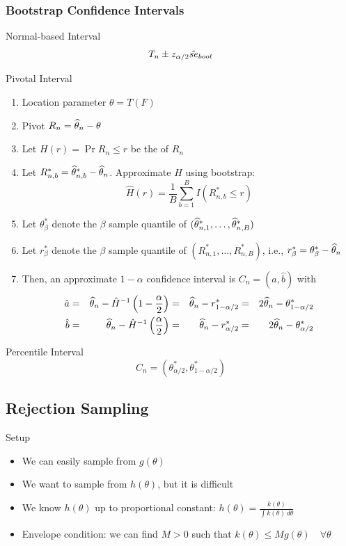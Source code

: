\documentclass[landscape]{article}
\begin{document}
\begin{multicols*}{2}
\subsubsection{Bootstrap Confidence Intervals}

Normal-based Interval
$$T_n \pm z_{\alpha/2}\hat{se}_{boot}$$

Pivotal Interval
\begin{enumerate}
  \item Location parameter $\theta = T(F)$
  \item Pivot $R_n = \widehat{\theta}_n - \theta$ 
  \item Let $H(r) = \Pr{R_n \le r}$ be the \cdf of $R_n$
  \item Let $R_{n,b}^* = \widehat{\theta}_{n,b}^* - \widehat{\theta}_n$.
    Approximate $H$ using bootstrap: 
    $$\hat{H}(r) = \frac{1}{B}\sum_{b=1}^B I(R_{n,b}^* \le r)$$
  \item Let $\theta_\beta^*$ denote the $\beta$ sample quantile of 
    $(\widehat{\theta}_{n,1}^*,\dots,\widehat{\theta}_{n,B}^*)$
  \item Let $r_\beta^*$ denote the $\beta$ sample quantile of 
    $(R_{n,1}^*,\dots,R_{n,B}^*)$, i.e., 
    $r_\beta^* = \theta_\beta^* - \widehat{\theta}_n$
  \item Then, an approximate $1-\alpha$ confidence interval is 
    $C_n = \left( \hat{a}, \hat{b} \right)$ with
    \begin{align*}
    \hat{a} 
      &=& \widehat{\theta}_n - \hat{H}^{-1}\left( 1-\frac{\alpha}{2} \right) 
      &=& \widehat{\theta}_n - r_{1-\alpha/2}^*
      &=& 2\widehat{\theta}_n - \theta_{1-\alpha/2}^* \\
    \hat{b} 
      &=& \widehat{\theta}_n - \hat{H}^{-1}\left( \frac{\alpha}{2} \right) 
      &=& \widehat{\theta}_n - r_{\alpha/2}^*
      &=& 2\widehat{\theta}_n - \theta_{\alpha/2}^* 
    \end{align*}
\end{enumerate}

Percentile Interval
$$C_n = \left( \theta_{\alpha/2}^*, \theta_{1-\alpha/2}^* \right)$$

\subsection{Rejection Sampling}
Setup
\begin{itemize}
  \item We can easily sample from $g(\theta)$
  \item We want to sample from $h(\theta)$, but it is difficult
  \item We know $h(\theta)$ up to proportional constant: 
    $h(\theta) = \displaystyle\frac{k(\theta)}{\int k(\theta)\,d\theta}$
  \item Envelope condition: we can find $M > 0$ such that
    $k(\theta) \le Mg(\theta) \quad \forall \theta$
\end{itemize}


\end{multicols*}
\end{document}
